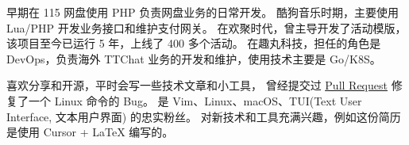 
\begin{cvparagraph}

早期在 115 网盘使用 PHP 负责网盘业务的日常开发。
酷狗音乐时期，主要使用 Lua/PHP 开发业务接口和维护支付网关。
在欢聚时代，曾主导开发了活动模版，该项目至今已运行 5 年，上线了 400 多个活动。
在趣丸科技，担任的角色是 DevOps，负责海外 TTChat 业务的开发和维护，使用技术主要是 Go/K8S。

喜欢分享和开源，平时会写一些技术文章和小工具，
曾经提交过 \href{https://github.com/shadow-maint/shadow/pull/1086}{\uline{Pull Request}} 修复了一个 Linux 命令的 Bug。
是 Vim、Linux、macOS、TUI(Text User Interface, 文本用户界面) 的忠实粉丝。
对新技术和工具充满兴趣，例如这份简历是使用 Cursor + LaTeX 编写的。
\end{cvparagraph}
